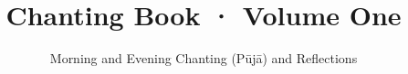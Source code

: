\documentclass[
  babelLanguage=portuguese,
  final,
]{chantingbook}
\title{Chanting Book · Volume One}
\subtitle{Morning and Evening Chanting (Pūjā) and Reflections}
\begin{document}
\mainmatter

\usePsMarksPartOnly



\end{document}
